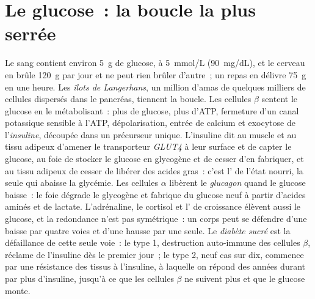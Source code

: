 \section{Le glucose~: la boucle la plus serrée}

\begin{definition}\label{def:b3:endocrinology:glucose}
Le sang contient environ \qty{5}{g} de glucose, à \qty{5}{mmol/L}
(\qty{90}{mg/dL}), et le cerveau en brûle \qty{120}{g} par jour et ne
peut rien brûler d'autre~; un repas en délivre \qty{75}{g} en une heure.
Les \emph{îlots de Langerhans}, un million d'amas de quelques milliers
de cellules dispersés dans le pancréas, tiennent la boucle. Les cellules
$\beta$ sentent le glucose en le métabolisant~: plus de glucose, plus
d'ATP, fermeture d'un canal potassique sensible à l'ATP,
dépolarisation, entrée de calcium et exocytose de l'\emph{insuline},
 découpée dans un précurseur unique. L'insuline dit au
muscle et au tissu adipeux d'amener le transporteur \emph{GLUT4} à leur
surface et de capter le glucose, au foie de stocker le glucose en
glycogène et de cesser d'en fabriquer, et au tissu adipeux de cesser de
libérer des acides gras~: c'est l' de l'état nourri, la seule qui
abaisse la glycémie. Les cellules $\alpha$ libèrent le \emph{glucagon}
quand le glucose baisse~: le foie dégrade le glycogène et fabrique du
glucose neuf à partir d'acides aminés et de lactate. L'adrénaline, le
cortisol et l' de croissance élèvent aussi le glucose, et la
redondance n'est pas symétrique~: un corps peut se défendre d'une baisse
par quatre voies et d'une hausse par une seule. Le \emph{diabète sucré}
est la défaillance de cette seule voie~: le type 1, destruction
auto-immune des cellules $\beta$, réclame de l'insuline dès le premier
jour~; le type 2, neuf cas sur dix, commence par une résistance des
tissus à l'insuline, à laquelle on répond des années durant par plus
d'insuline, jusqu'à ce que les cellules $\beta$ ne suivent plus et que
le glucose monte.
\end{definition}


